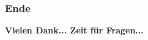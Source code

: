 
\begin{frame}
  	\frametitle{Ende}
  	\centering
	\textbf{Vielen Dank... Zeit für Fragen...}
\end{frame}
